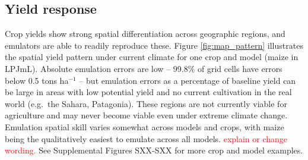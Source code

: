 \documentclass[gmd, manuscript]{copernicus} %
\begin{document}
\subsection{Yield response}


Crop yields show strong spatial differentiation across geographic regions, and emulators are able to readily reproduce these. Figure \ref{fig:map_pattern} illustrates the spatial yield pattern under current climate for one crop and model (maize in LPJmL). Absolute emulation errors are low --  99.8\% of grid cells have errors below 0.5 tons ha$^{-1}$ -- but 
emulation errors as a percentage of baseline yield can be large in areas with low potential yield and no current cultivation in the real world (e.g.\ the Sahara, Patagonia).
These regions are not currently viable for agriculture and may never become viable even under extreme climate change.  
Emulation spatial skill varies somewhat across models and crops, with maize being the qualitatively easiest to emulate  across all models. \textcolor{red}{explain or change wording.} %
See Supplemental Figures SXX-SXX for more crop and model examples. 
\end{document}
